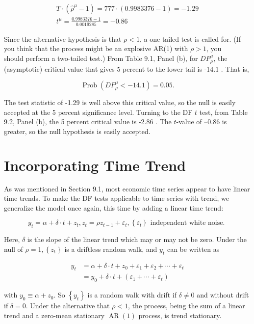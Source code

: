 \documentclass[10pt]{article}
\begin{document}
$$
\begin{gathered}
T \cdot\left(\hat{\rho}^{\mu}-1\right)=777 \cdot(0.9983376-1)=-1.29 \\
t^{\mu}=\frac{0.9983376-1}{0.0019285}=-0.86
\end{gathered}
$$

Since the alternative hypothesis is that $\rho<1$, a one-tailed test is called for. (If you think that the process might be an explosive AR(1) with $\rho>1$, you\\
should perform a two-tailed test.) From Table 9.1, Panel (b), for $D F_{\rho}^{\mu}$, the (asymptotic) critical value that gives 5 percent to the lower tail is -14.1 . That is,

$$
\operatorname{Prob}\left(D F_{\rho}^{\mu}<-14.1\right)=0.05 .
$$

The test statistic of -1.29 is well above this critical value, so the null is easily accepted at the 5 percent significance level. Turning to the DF $t$ test, from Table 9.2, Panel (b), the 5 percent critical value is -2.86 . The $t$-value of --0.86 is greater, so the null hypothesis is easily accepted.

\section*{Incorporating Time Trend}
As was mentioned in Section 9.1, most economic time series appear to have linear time trends. To make the DF tests applicable to time series with trend, we generalize the model once again, this time by adding a linear time trend:


\begin{equation*}
y_{t}=\alpha+\delta \cdot t+z_{t}, z_{t}=\rho z_{t-1}+\varepsilon_{t},\left\{\varepsilon_{t}\right\} \text { independent white noise. } \tag{9.3.15}
\end{equation*}


Here, $\delta$ is the slope of the linear trend which may or may not be zero. Under the null of $\rho=1,\left\{z_{t}\right\}$ is a driftless random walk, and $y_{t}$ can be written as


\begin{align*}
y_{t} & =\alpha+\delta \cdot t+z_{0}+\varepsilon_{1}+\varepsilon_{2}+\cdots+\varepsilon_{t} \\
& =y_{0}+\delta \cdot t+\left(\varepsilon_{1}+\cdots+\varepsilon_{t}\right) \tag{9.3.16}
\end{align*}


with $y_{0} \equiv \alpha+z_{0}$. So $\left\{y_{t}\right\}$ is a random walk with drift if $\delta \neq 0$ and without drift if $\delta=0$. Under the alternative that $\rho<1$, the process, being the sum of a linear trend and a zero-mean stationary $\operatorname{AR}(1)$ process, is trend stationary.
\end{document}
